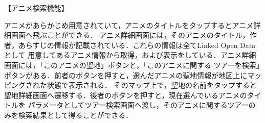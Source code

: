 【アニメ検索機能】
\par
アニメがあらかじめ用意されていて，アニメのタイトルをタップするとアニメ詳細画面へ飛ぶことができる．
アニメ詳細画面には，そのアニメのタイトル，作者，あらすじの情報が記載されている．これらの情報は全てLinked Open Dataとして
用意してあるアニメ情報から取得，および表示をしている．アニメ詳細画面には，「このアニメの聖地」ボタンと，「このアニメに関する
ツアーを検索」ボタンがある．前者のボタンを押すと，選んだアニメの聖地情報が地図上にマッピングされた状態で表示される．
そのマップ上で，聖地の名前をタップすると聖地詳細画面へ遷移する．後者のボタンを押すと，現在選んでいるアニメのタイトルを
パラメータとしてツアー検索画面へ渡し，そのアニメに関するツアーのみを検索結果として得ることができる．
